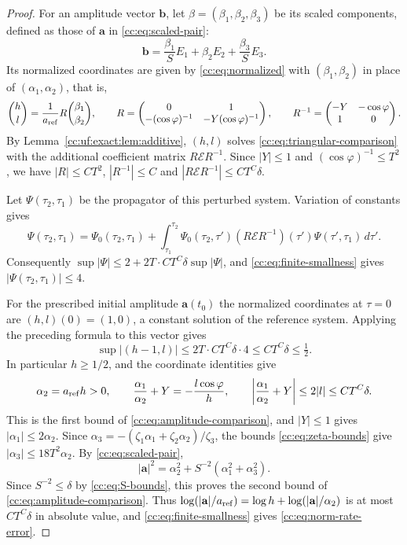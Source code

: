 \begin{proof}
For an amplitude vector $\mathbf b$, let $\beta=(\beta_1,\beta_2,\beta_3)$
be its scaled components, defined as those of $\mathbf a$ in
\eqref{cc:eq:scaled-pair}:
\[
 \mathbf b=\frac{\beta_1}SE_1+\beta_2E_2+\frac{\beta_3}SE_3 .
\]
Its normalized coordinates are given by \eqref{cc:eq:normalized} with
$(\beta_1,\beta_2)$ in place of $(\alpha_1,\alpha_2)$, that is,
\[
 \binom hl=\frac1{a_{\rm ref}}R\binom{\beta_1}{\beta_2},\qquad
 R=\begin{pmatrix}0&1\\-(\cos\varphi)^{-1}&-Y(\cos\varphi)^{-1}\end{pmatrix},
 \qquad R^{-1}=\begin{pmatrix}-Y&-\cos\varphi\\1&0\end{pmatrix}.
\]
By Lemma~\ref{cc:uf:exact:lem:additive}, $(h,l)$ solves
\eqref{cc:eq:triangular-comparison} with the additional coefficient
matrix $R\mathcal ER^{-1}$. Since $|Y|\le1$ and
$(\cos\varphi)^{-1}\le T^2$, we have $|R|\le CT^2$, $|R^{-1}|\le C$
and $|R\mathcal ER^{-1}|\le CT^C\delta$.

Let $\Psi(\tau_2,\tau_1)$ be the propagator of this perturbed system.
Variation of constants gives
\[
 \Psi(\tau_2,\tau_1)=\Psi_0(\tau_2,\tau_1)
 +\int_{\tau_1}^{\tau_2}\Psi_0(\tau_2,\tau')
       (R\mathcal ER^{-1})(\tau')\Psi(\tau',\tau_1)\,d\tau'.
\]
Consequently $\sup|\Psi|\le2+2T\cdot CT^C\delta\sup|\Psi|$, and
\eqref{cc:eq:finite-smallness} gives $|\Psi(\tau_2,\tau_1)|\le4$.

For the prescribed initial amplitude $\mathbf a(t_0)$ the normalized
coordinates at $\tau=0$ are $(h,l)(0)=(1,0)$, a constant solution of the reference
system. Applying the preceding formula to this vector gives
\[
 \sup|(h-1,l)|\le2T\cdot CT^C\delta\cdot4\le CT^C\delta\le\tfrac12.
\]
In particular $h\ge1/2$, and the coordinate identities give
\[
 \alpha_2=a_{\rm ref}h>0,\qquad
 \frac{\alpha_1}{\alpha_2}+Y=-\frac{l\cos\varphi}{h},\qquad
 \left|\frac{\alpha_1}{\alpha_2}+Y\right|\le2|l|\le CT^C\delta.
\]
This is the first bound of \eqref{cc:eq:amplitude-comparison}, and
$|Y|\le1$ gives $|\alpha_1|\le2\alpha_2$. Since
$\alpha_3=-(\zeta_1\alpha_1+\zeta_2\alpha_2)/\zeta_3$, the bounds
\eqref{cc:eq:zeta-bounds} give $|\alpha_3|\le18T^2\alpha_2$. By
\eqref{cc:eq:scaled-pair},
\[
 |\mathbf a|^2=\alpha_2^2+S^{-2}(\alpha_1^2+\alpha_3^2).
\]
Since $S^{-2}\le\delta$ by \eqref{cc:eq:S-bounds}, this proves the
second bound of
\eqref{cc:eq:amplitude-comparison}. Thus
$\log(|\mathbf a|/a_{\rm ref})=\log h+\log(|\mathbf a|/\alpha_2)$
is at most $CT^C\delta$ in absolute value, and
\eqref{cc:eq:finite-smallness} gives \eqref{cc:eq:norm-rate-error}.


\end{proof}
